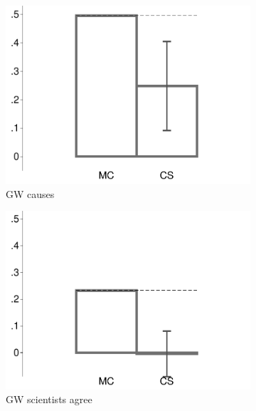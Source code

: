 \begin{figure}[t]
\begin{subfigure}{.325\textwidth}
		\includegraphics[width=\textwidth]{../figs/confidence_score_increase_study1.pdf}
		\caption{GW causes}
	\end{subfigure}	
	\hfill
	\begin{subfigure}{.325\textwidth}\centering
		\includegraphics[width=\textwidth]{../figs/confidence_score_science_study1.pdf}
		\caption{GW scientists agree}
	\end{subfigure}	
	\begin{subfigure}{.325\textwidth}\centering

\end{subfigure}
\end{figure}

